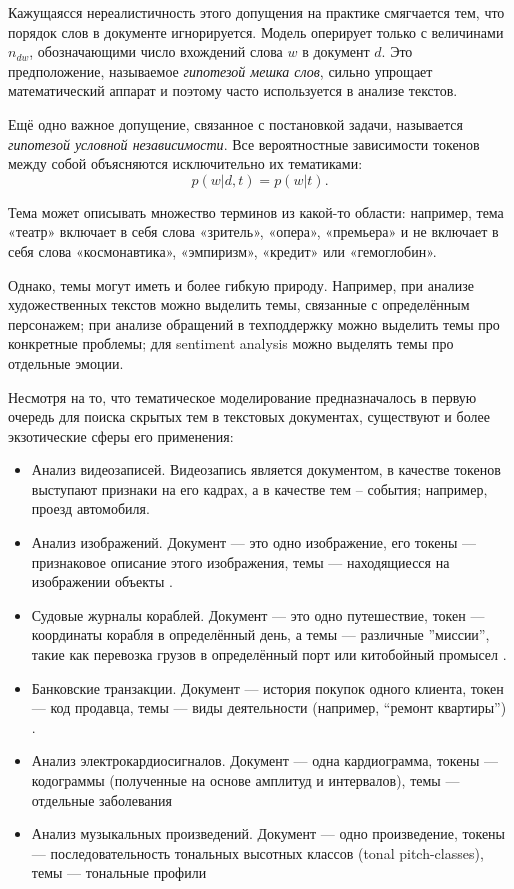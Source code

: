 Кажущаясся нереалистичность этого допущения на практике смягчается тем, что порядок слов в документе игнорируется. Модель оперирует только с величинами $n_{dw}$, обозначающими число вхождений слова $w$ в документ $d$. Это предположение, называемое  \textit{гипотезой мешка слов}, сильно упрощает математический аппарат и поэтому часто используется в анализе текстов.

Ещё одно важное допущение, связанное с постановкой задачи, называется \textit{гипотезой условной независимости}. Все вероятностные зависимости токенов между собой объясняются исключительно их тематиками:
\begin{equation}
    p(w| d,t) = p(w| t).
\end{equation}

Тема может описывать множество терминов из какой-то области: например, тема «театр» включает в себя слова «зритель», «опера», «премьера» и не включает в себя слова «космонавтика», «эмпиризм», «кредит» или «гемоглобин». 

Однако, темы могут иметь и более гибкую природу. Например, при анализе художественных текстов можно выделить темы, связанные с определённым персонажем; при анализе обращений в техподдержку можно выделить темы про конкретные проблемы; для sentiment analysis можно выделять темы про отдельные эмоции.

Несмотря на то, что тематическое моделирование предназначалось в первую очередь для поиска скрытых тем в текстовых документах, существуют и более экзотические сферы его применения:

\begin{itemize}
    \item Анализ видеозаписей. Видеозапись является документом, в качестве токенов выступают признаки на его кадрах, а в качестве тем – события; например, проезд автомобиля\cite{sparse}.
    \item Анализ изображений. Документ --- это одно изображение, его токены --- признаковое описание этого изображения, темы --- находящиесся на изображении объекты \cite{mml1}.
    \item Судовые журналы кораблей. Документ --- это одно путешествие, токен --- координаты корабля в определённый день, а темы --- различные ''миссии'', такие как перевозка грузов в определённый порт или китобойный промысел \cite{dh_sea}. 
    \item Банковские транзакции. Документ --- история покупок одного клиента, токен --- код продавца, темы --- виды деятельности (например, ``ремонт квартиры'') \cite{egorov2019topic}.
    \item Анализ электрокардиосигналов. Документ --- одна кардиограмма, токены --- кодограммы (полученные на основе амплитуд и интервалов), темы --- отдельные заболевания \cite{shapulin}
    \item Анализ музыкальных произведений. Документ --- одно произведение, токены --- последовательность тональных высотных классов (tonal pitch-classes), темы --- тональные профили \cite{moss2019transitions}
\end{itemize}

